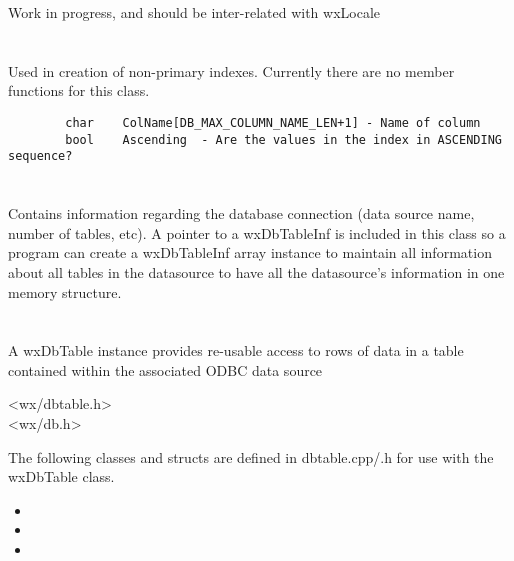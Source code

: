 Work in progress, and should be inter-related with wxLocale


\section{}\label{wxdbidxdef}

Used in creation of non-primary indexes.  Currently there are no member 
functions for this class.

\begin{verbatim}
        char    ColName[DB_MAX_COLUMN_NAME_LEN+1] - Name of column
        bool    Ascending  - Are the values in the index in ASCENDING sequence?
\end{verbatim}


\section{}\label{wxdbinf}

Contains information regarding the database connection (data source name, 
number of tables, etc).  A pointer to a wxDbTableInf is included in this 
class so a program can create a wxDbTableInf array instance to maintain all
information about all tables in the datasource to have all the datasource's
information in one memory structure.


\section{}\label{wxdbtable}

A wxDbTable instance provides re-usable access to rows of data in
a table contained within the associated ODBC data source


<wx/dbtable.h>\\
<wx/db.h>


The following classes and structs are defined in dbtable.cpp/.h for use with the wxDbTable class.
\begin{itemize}\itemsep=0pt
\item {}
\item {}
\item {}
\end{itemize}

